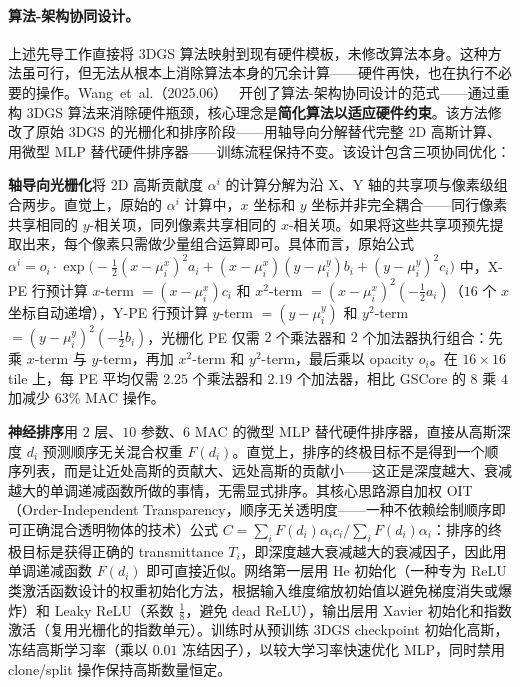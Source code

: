 \paragraph{算法-架构协同设计。}

上述先导工作直接将 3DGS 算法映射到现有硬件模板，未修改算法本身。这种方法虽可行，但无法从根本上消除算法本身的冗余计算——硬件再快，也在执行不必要的操作。Wang~et~al.（2025.06）~\cite{2506_07069} 开创了算法-架构协同设计的范式——通过重构 3DGS 算法来消除硬件瓶颈，核心理念是\textbf{简化算法以适应硬件约束}。该方法修改了原始 3DGS 的光栅化和排序阶段——用轴导向分解替代完整 2D 高斯计算、用微型 MLP 替代硬件排序器——训练流程保持不变。该设计包含三项协同优化：

\textbf{轴导向光栅化}将 2D 高斯贡献度 $\alpha^i$ 的计算分解为沿 X、Y 轴的共享项与像素级组合两步。直觉上，原始的 $\alpha^i$ 计算中，$x$ 坐标和 $y$ 坐标并非完全耦合——同行像素共享相同的 $y$-相关项，同列像素共享相同的 $x$-相关项。如果将这些共享项预先提取出来，每个像素只需做少量组合运算即可。具体而言，原始公式 $\alpha^i = o_i \cdot \exp\bigl(-\tfrac{1}{2}(x-\mu_i^x)^2 a_i + (x-\mu_i^x)(y-\mu_i^y) b_i + (y-\mu_i^y)^2 c_i\bigr)$ 中，X-PE 行预计算 $x$-term $= (x - \mu_i^x)c_i$ 和 $x^2$-term $= (x - \mu_i^x)^2(-\tfrac{1}{2}a_i)$（$16$ 个 $x$ 坐标自动递增），Y-PE 行预计算 $y$-term $= (y - \mu_i^y)$ 和 $y^2$-term $= (y - \mu_i^y)^2(-\tfrac{1}{2}b_i)$，光栅化 PE 仅需 $2$ 个乘法器和 $2$ 个加法器执行组合：先乘 $x$-term 与 $y$-term，再加 $x^2$-term 和 $y^2$-term，最后乘以 opacity $o_i$。在 $16\times16$ tile 上，每 PE 平均仅需 $2.25$ 个乘法器和 $2.19$ 个加法器，相比 GSCore 的 $8$ 乘 $4$ 加减少 $63\%$ MAC 操作。

\textbf{神经排序}用 $2$ 层、$10$ 参数、$6$ MAC 的微型 MLP 替代硬件排序器，直接从高斯深度 $d_i$ 预测顺序无关混合权重 $F(d_i)$。直觉上，排序的终极目标不是得到一个顺序列表，而是让近处高斯的贡献大、远处高斯的贡献小——这正是深度越大、衰减越大的单调递减函数所做的事情，无需显式排序。其核心思路源自加权 OIT（Order-Independent Transparency，顺序无关透明度——一种不依赖绘制顺序即可正确混合透明物体的技术）公式 $C = \sum_{i} F(d_i)\alpha_i c_i \big/ \sum_{i} F(d_i)\alpha_i$：排序的终极目标是获得正确的 transmittance $T_i$，即深度越大衰减越大的衰减因子，因此用单调递减函数 $F(d_i)$ 即可直接近似。网络第一层用 He 初始化（一种专为 ReLU 类激活函数设计的权重初始化方法，根据输入维度缩放初始值以避免梯度消失或爆炸）和 Leaky ReLU（系数 $\tfrac{1}{8}$，避免 dead ReLU），输出层用 Xavier 初始化和指数激活（复用光栅化的指数单元）。训练时从预训练 3DGS checkpoint 初始化高斯，冻结高斯学习率（乘以 $0.01$ 冻结因子），以较大学习率快速优化 MLP，同时禁用 clone/split 操作保持高斯数量恒定。

